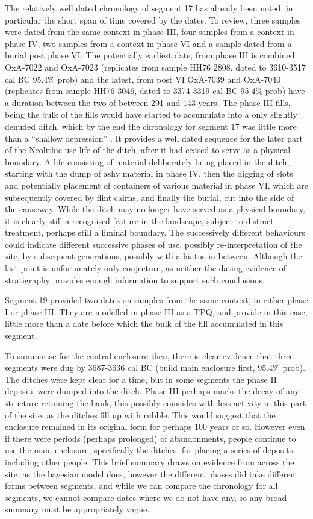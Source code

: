 The relatively well dated chronology of segment 17 has already been noted, in particular the short span of time covered by the dates. To review, three samples were dated from the same context in phase III, four samples from a context in phase IV, two samples from a context in phase VI and a sample dated from a burial post phase VI. The potentially earliest date, from phase III is combined OxA-7022 and OxA-7023 (replicates from sample HH76 2808, dated to 3610-3517 cal BC 95.4\% prob) and the latest, from post VI OxA-7039 and OxA-7040 (replicates from sample HH76 3046, dated to 3374-3319 cal BC 95.4\% prob) have a duration between the two of between 291 and 143 years. The phase III fills, being the bulk of the fills would have started to accumulate into a only slightly denuded ditch, which by the end the chronology for segment 17 was little more than a ``shallow depression'' \cite[56]{Mercer:2008fk}. It provides a well dated sequence for the later part of the Neolithic use life of the ditch, after it had ceased to serve as a physical boundary. A life consisting of material deliberately being placed in the ditch, starting with the dump of ashy material in phase IV, then the digging of slots and potentially placement of containers of various material in phase VI, which are subsequently covered by flint cairns, and finally the burial, cut into the side of the causeway. While the ditch may no longer have served as a physical boundary, it is clearly still a recognised feature in the landscape, subject to distinct treatment, perhaps still a liminal boundary. The successively different behaviours could indicate different successive phases of use, possibly re-interpretation of the site, by subsequent generations, possibly with a hiatus in between. Although the last point is unfortunately only conjecture, as neither the dating evidence of stratigraphy provides enough information to support such conclusions.

Segment 19 provided two dates on samples from the same context, in either phase I or phase III. They are modelled in phase III as a TPQ, and provide in this case, little more than a date before which the bulk of the fill accumulated in this segment.

To summarise for the central enclosure then, there is clear evidence that three segments were dug by 3687-3636 cal BC (build main enclosure first, 95.4\% prob). The ditches were kept clear for a time, but in some segments the phase II deposits were dumped into the ditch. Phase III perhaps marks the decay of any structure retaining the bank, this possibly coincides with less activity in this part of the site, as the ditches fill up with rubble. This would suggest that the enclosure remained in its original form for perhaps 100 years or so. However even if there were periods (perhaps prolonged) of abandonments, people continue to use the main enclosure, specifically the ditches, for placing a series of deposits, including other people. This brief summary draws on evidence from across the site, as the bayesian model does, however the different phases did take different forms between segments, and while we can compare the chronology for all segments, we cannot compare dates where we do not have any, so any broad summary must be appropriately vague.

